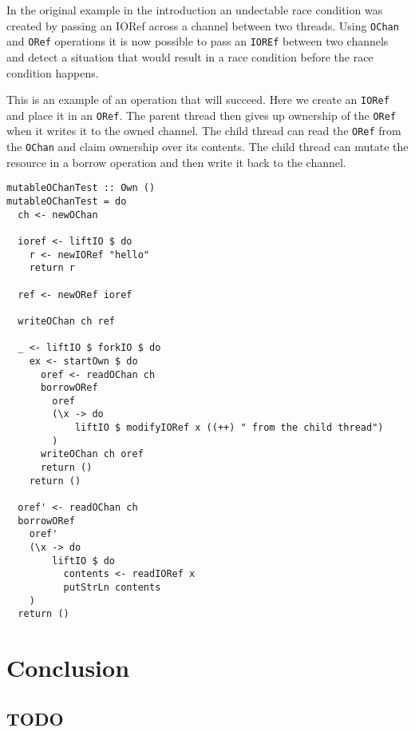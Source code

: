\documentclass[onehalf,11pt]{beavtex}
\begin{document}
In the original example in the introduction an undectable race condition was
created by passing an IORef across a channel between two threads.
Using \texttt{OChan} and \texttt{ORef} operations it is now possible
to pass an \texttt{IOREf} between two channels and detect a situation
that would result in a race condition before the race condition happens.

This is an example of an operation that will succeed. Here we create an
\texttt{IORef} and place it in an \texttt{ORef}. The parent thread
then gives up ownership of the \texttt{ORef} when it writes it to the
owned channel. The child thread can read the \texttt{ORef} from the
\texttt{OChan} and claim ownership over its contents. The child thread
can mutate the resource in a borrow operation and then write it back to
the channel. 

\begin{verbatim}
mutableOChanTest :: Own ()
mutableOChanTest = do
  ch <- newOChan

  ioref <- liftIO $ do
    r <- newIORef "hello"
    return r

  ref <- newORef ioref

  writeOChan ch ref

  _ <- liftIO $ forkIO $ do
    ex <- startOwn $ do
      oref <- readOChan ch
      borrowORef
        oref
        (\x -> do
            liftIO $ modifyIORef x ((++) " from the child thread")
        )
      writeOChan ch oref
      return ()
    return ()

  oref' <- readOChan ch
  borrowORef
    oref'
    (\x -> do
        liftIO $ do
          contents <- readIORef x
          putStrLn contents
    )
  return ()
\end{verbatim}









\chapter{Conclusion}
\section{TODO}


{}

\end{document}
